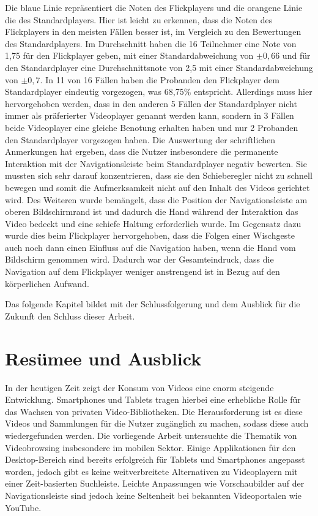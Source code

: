 \documentclass[11pt,a4paper]{report}
\begin{document}
Die blaue Linie repräsentiert die Noten des Flickplayers und die orangene Linie die des Standardplayers. Hier ist leicht zu erkennen, dass die Noten des Flickplayers in den meisten Fällen besser ist, im Vergleich zu den Bewertungen des Standardplayers. Im Durchschnitt haben die 16 Teilnehmer eine Note von 1,75 für den Flickplayer geben, mit einer Standardabweichung von  $\pm 0,66$ und für den Standardplayer eine Durchschnittsnote von 2,5 mit einer Standardabweichung von  $\pm 0,7$. In 11 von 16 Fällen haben die Probanden den Flickplayer dem Standardplayer eindeutig vorgezogen, was 68,75\% entspricht. Allerdings muss hier hervorgehoben werden, dass in den anderen 5 Fällen der Standardplayer nicht immer als präferierter Videoplayer genannt werden kann, sondern in 3 Fällen beide Videoplayer eine gleiche Benotung erhalten haben und nur 2 Probanden den Standardplayer vorgezogen haben. Die Auswertung der schriftlichen Anmerkungen hat ergeben, dass die Nutzer insbesondere die permanente Interaktion mit der Navigationsleiste beim Standardplayer negativ bewerten. Sie mussten sich sehr darauf konzentrieren, dass sie den Schieberegler nicht zu schnell bewegen und somit die Aufmerksamkeit nicht auf den Inhalt des Videos gerichtet wird. Des Weiteren wurde bemängelt, dass die Position der Navigationsleiste am oberen Bildschirmrand ist und dadurch die Hand während der Interaktion das Video bedeckt und eine schiefe Haltung erforderlich wurde. Im Gegensatz dazu wurde dies beim Flickplayer hervorgehoben, dass die Folgen einer Wischgeste auch noch dann einen Einfluss auf die Navigation haben, wenn die Hand vom Bildschirm genommen wird. Dadurch war der Gesamteindruck, dass die Navigation auf dem Flickplayer weniger anstrengend ist in Bezug auf den körperlichen Aufwand.

Das folgende Kapitel bildet mit der Schlussfolgerung und dem Ausblick für die Zukunft den Schluss dieser Arbeit.

\chapter{Resümee und Ausblick}

In der heutigen Zeit zeigt der Konsum von Videos eine enorm steigende Entwicklung. Smartphones und Tablets tragen hierbei eine erhebliche Rolle für das Wachsen von privaten Video-Bibliotheken. Die Herausforderung ist es diese Videos und Sammlungen für die Nutzer zugänglich zu machen, sodass diese auch wiedergefunden werden. Die vorliegende Arbeit untersuchte die Thematik von Videobrowsing insbesondere im mobilen Sektor. Einige Applikationen für den Desktop-Bereich sind bereits erfolgreich für Tablets und Smartphones angepasst worden, jedoch gibt es keine weitverbreitete Alternativen zu Videoplayern mit einer Zeit-basierten Suchleiste. Leichte Anpassungen wie Vorschaubilder auf der Navigationsleiste sind jedoch keine Seltenheit bei bekannten Videoportalen wie YouTube.
\end{document}

